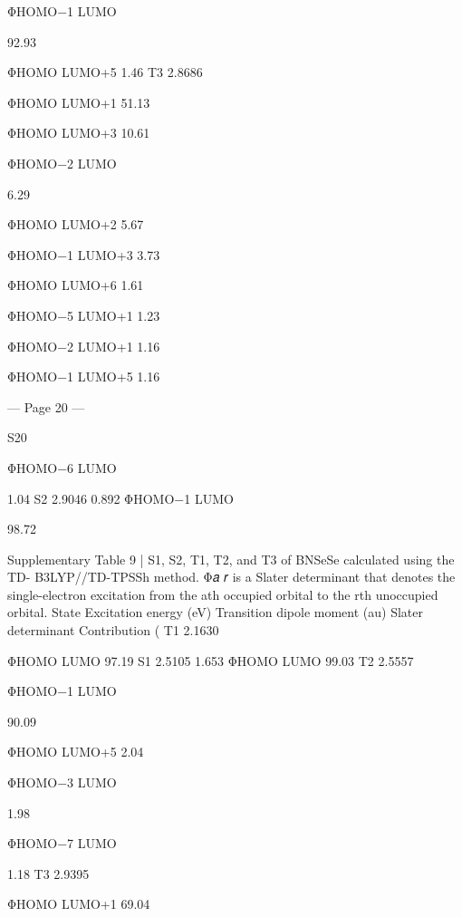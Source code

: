 ΦHOMO−1
LUMO
 
92.93 
 
 
 
ΦHOMO
LUMO+5 
1.46 
T3 
2.8686 
 
ΦHOMO
LUMO+1 
51.13 
 
 
 
ΦHOMO
LUMO+3 
10.61 
 
 
 
ΦHOMO−2
LUMO
 
6.29 
 
 
 
ΦHOMO
LUMO+2 
5.67 
 
 
 
ΦHOMO−1
LUMO+3 
3.73 
 
 
 
ΦHOMO
LUMO+6 
1.61 
 
 
 
ΦHOMO−5
LUMO+1 
1.23 
 
 
 
ΦHOMO−2
LUMO+1 
1.16 
 
 
 
ΦHOMO−1
LUMO+5 
1.16 


--- Page 20 ---
 
S20 
 
 
 
ΦHOMO−6
LUMO
 
1.04 
S2 
2.9046 
0.892 
ΦHOMO−1
LUMO
 
98.72 
 
 
Supplementary Table 9 | S1, S2, T1, T2, and T3 of BNSeSe calculated using the TD-
B3LYP//TD-TPSSh method. Φ𝑎
𝑟 is a Slater determinant that denotes the single-electron 
excitation from the ath occupied orbital to the rth unoccupied orbital. 
State 
Excitation 
energy (eV) 
Transition dipole  
moment (au) 
Slater 
determinant 
Contribution (%
T1 
2.1630 
 
ΦHOMO
LUMO       
97.19 
S1 
2.5105 
1.653 
ΦHOMO
LUMO 
99.03 
T2 
2.5557 
 
ΦHOMO−1
LUMO
 
90.09 
 
 
 
ΦHOMO
LUMO+5 
2.04 
 
 
 
ΦHOMO−3
LUMO
 
1.98 
 
 
 
ΦHOMO−7
LUMO
 
1.18 
T3 
2.9395 
 
ΦHOMO
LUMO+1 
69.04 
 
